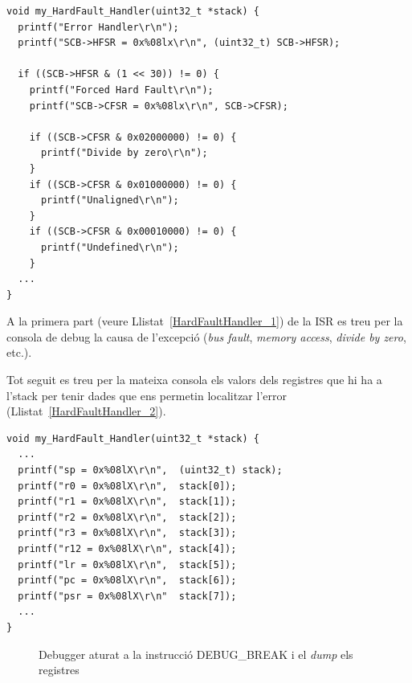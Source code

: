 \begin{lstlisting}[style=customc,caption=Codi HardFault\_Handler,label=HardFaultHandler_1]
void my_HardFault_Handler(uint32_t *stack) {
  printf("Error Handler\r\n");
  printf("SCB->HFSR = 0x%08lx\r\n", (uint32_t) SCB->HFSR);

  if ((SCB->HFSR & (1 << 30)) != 0) {
    printf("Forced Hard Fault\r\n");
    printf("SCB->CFSR = 0x%08lx\r\n", SCB->CFSR);

    if ((SCB->CFSR & 0x02000000) != 0) {
      printf("Divide by zero\r\n");
    }
    if ((SCB->CFSR & 0x01000000) != 0) {
      printf("Unaligned\r\n");
    }
    if ((SCB->CFSR & 0x00010000) != 0) {
      printf("Undefined\r\n");
    }
  ...
}
\end{lstlisting}

A la primera part (veure Llistat~\ref{HardFaultHandler_1}) de la \gls{ISR} es treu per la consola de debug la causa de l'excepció ({\em bus fault}, {\em memory access}, {\em divide by zero}, etc.).

Tot seguit es treu per la mateixa consola els valors dels registres que hi ha a l'\gls{stack} per tenir dades que ens permetin localitzar l'error (Llistat~\ref{HardFaultHandler_2}).

\begin{lstlisting}[style=customc,caption=Codi HardFault\_Handler,label=HardFaultHandler_2]
void my_HardFault_Handler(uint32_t *stack) {
  ...
  printf("sp = 0x%08lX\r\n",  (uint32_t) stack);
  printf("r0 = 0x%08lX\r\n",  stack[0]);
  printf("r1 = 0x%08lX\r\n",  stack[1]);
  printf("r2 = 0x%08lX\r\n",  stack[2]);
  printf("r3 = 0x%08lX\r\n",  stack[3]);
  printf("r12 = 0x%08lX\r\n", stack[4]);
  printf("lr = 0x%08lX\r\n",  stack[5]);
  printf("pc = 0x%08lX\r\n",  stack[6]);
  printf("psr = 0x%08lX\r\n"  stack[7]);
  ...
}
\end{lstlisting}


\begin{figure}
 \centering
 \caption{Debugger aturat a la instrucció DEBUG\_BREAK i el {\em dump} els registres}
 \label{fig:HardFaultDump}
\end{figure}


